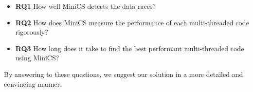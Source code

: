 \vspace{0.2cm}

\begin{itemize}
	\setlength\itemsep{0.5em}
	\item[] \textbf{RQ1} How well MiniCS detects the data races?
	\item[] \textbf{RQ2} How does MiniCS measure the performance of each multi-threaded code rigorously?
	\item[] \textbf{RQ3} How long does it take to find the best performant multi-threaded code using MiniCS?
\end{itemize}

By answering to these questions, we suggest our solution in a more detailed and convincing manner.